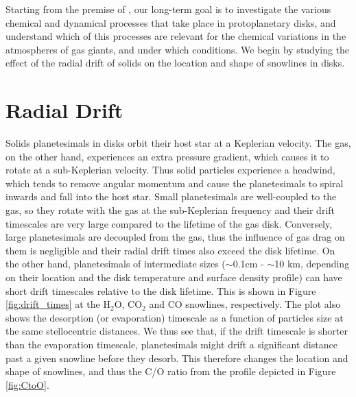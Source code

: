 \documentclass[12pt, preprint]{aastex}
\begin{document}
Starting from the premise of \citet{oberg11}, our long-term goal is to investigate the various chemical and dynamical processes that take place in protoplanetary disks, and understand which of this processes are relevant for the chemical variations in the atmospheres of gas giants, and under which conditions. We begin by studying the effect of the radial drift of solids on the location and shape of snowlines in disks.  

\section{Radial Drift}

Solids planetesimals in disks orbit their host star at a Keplerian velocity. The gas, on the other hand, experiences an extra pressure gradient, which causes it to rotate at a sub-Keplerian velocity. Thus solid particles experience a headwind, which tends to remove angular momentum and cause the planetesimals to spiral inwards and fall into the host star. Small planetesimals are well-coupled to the gas, so they rotate with the gas at the sub-Keplerian frequency and their drift timescales are very large compared to the lifetime of the gas disk. Conversely, large planetesimals are decoupled from the gas, thus the influence of gas drag on them is negligible and their radial drift times also exceed the disk lifetime. On the other hand, planetesimals of intermediate sizes ($\sim$0.1cm - $\sim$10 km, depending on their location and the disk temperature and surface density profile) can have short drift timescales relative to the disk lifetime. This is shown in Figure \ref{fig:drift_times} at the H$_2$O, CO$_2$ and CO snowlines, respectively. The plot also shows the desorption (or evaporation) timescale as a function of particles size at the same stellocentric distances. We thus see that, if the drift timescale is shorter than the evaporation timescale, planetesimals might drift a significant distance past a given snowline before they desorb. This therefore changes the location and shape of snowlines, and thus the C/O ratio from the profile depicted in Figure \ref{fig:CtoO}.
\end{document}
